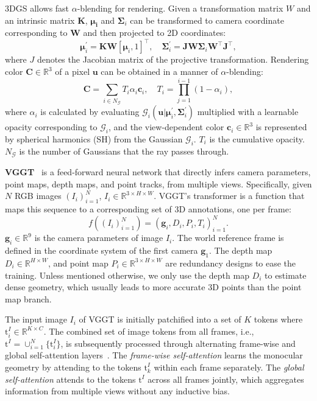 \documentclass[letterpaper, 10 pt, conference]{ieeeconf}  %
\newcommand{\R}{\mathbb{R}}
\newcommand{\bt}{\mathbf{t}}
\newcommand{\bq}{\mathbf{q}}
\newcommand{\bg}{\mathbf{g}}
\newcommand{\tok}{\mathrm{t}}
\begin{document}
3DGS allows fast $\alpha$-blending for rendering. Given a transformation matrix $W$ and an intrinsic matrix $\bm{K}$, $\bm{\mu_i}$ and $\bm{\Sigma}_i$ can be transformed to camera coordinate corresponding to $\bm{W}$ and then projected to 2D coordinates:
$$
\bm{\mu}_i^{'}=\bm{KW}[\bm{\mu}_i,1]^\top, \quad  \bm{\Sigma}_i^{'}=\bm{JW\Sigma}_i\bm{W}^\top \bm{J}^\top,
$$
where $J$ denotes the Jacobian matrix of the projective transformation. Rendering color $\bm{C}\in\mathbb R^3$ of a pixel $\bm u$ can be obtained in a manner of $\alpha$-blending:
$$
\bm{C} = \sum_{i\in N_{\mathcal G}} T_i \alpha_i \bm{c}_i,\quad T_i=\prod_{j=1}^{i-1}(1 - \alpha_i),
$$
where $\alpha_i$ is calculated by evaluating $\mathcal G_i(\bm{u}|\bm{\mu}_i^{'}, \bm{\Sigma}_i^{'})$ multiplied with a learnable opacity corresponding to $\mathcal G_i$, and the view-dependent color $\bm{c}_i\in\mathbb R^3$ is represented by spherical harmonics (SH) from the Gaussian $\mathcal G_i$. $T_i$ is the cumulative opacity. $N_\mathcal G$ is the number of Gaussians that the ray passes through. 


\textbf{VGGT}~\cite{wang2025vggt} is a feed-forward neural network that directly infers camera parameters, point maps, depth maps, and point tracks, from multiple views. Specifically, given $N$ RGB images $(I_i)_{i=1}^N$, $I_i \in \R^{3\times H\times W}$. VGGT's transformer is a function that maps this sequence to a corresponding set of 3D annotations, one per frame:
\begin{equation}
f\left((I_i)_{i=1}^N\right) = \left(\bg_i, D_i, P_i, T_i\right)_{i=1}^N.
\end{equation}
$\bg_i \in \mathbb{R}^9$ is the camera parameters of image $I_i$. The world reference frame is defined in the coordinate system of the first camera $\bg_1$. The depth map $D_i \in \R^{H\times W}$, and point map $P_i \in \R^{3\times H\times W}$ are redundancy designs to ease the training. Unless mentioned otherwise, we only use the depth map $D_i$ to estimate dense geometry, which usually leads to more accurate 3D points than the point map branch.


The input image $I_i$ of VGGT is initially patchified into a set of $K$ tokens where $\tok^I_i \in \R^{K\times C}$. The combined set of image tokens from all frames, i.e., $\tok^I = \cup_{i=1}^N \{\tok^I_i\}$, is subsequently processed through alternating frame-wise and global self-attention layers~\cite{vaswani2017attention}. The \textit{frame-wise self-attention} learns the monocular geometry by attending to the tokens $\tok^I_k$ within each frame separately. The \textit{global self-attention} attends to the tokens $\tok^I$ across all frames jointly, which aggregates information from multiple views without any inductive bias.
\end{document}
